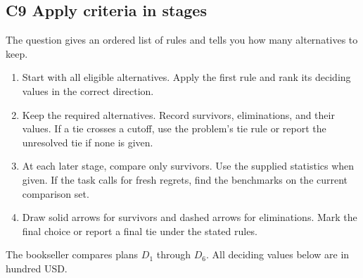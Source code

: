 \subsection{C9 \textemdash{} Apply criteria in stages}\label{crit:9}
\Cue The question gives an ordered list of rules and tells you how many alternatives to keep.
\begin{enumerate}
  \item Start with all eligible alternatives. Apply the first rule and rank its deciding values in the correct direction.
  \item Keep the required alternatives. Record survivors, eliminations, and their values. If a tie crosses a cutoff, use the problem's tie rule or report the unresolved tie if none is given.
  \item At each later stage, compare only survivors. Use the supplied statistics when given. If the task calls for fresh regrets, find the benchmarks on the current comparison set.
  \item Draw solid arrows for survivors and dashed arrows for eliminations. Mark the final choice or report a final tie under the stated rules.
\end{enumerate}
The bookseller compares plans \(D_1\) through \(D_6\). All deciding values below are in hundred USD.

